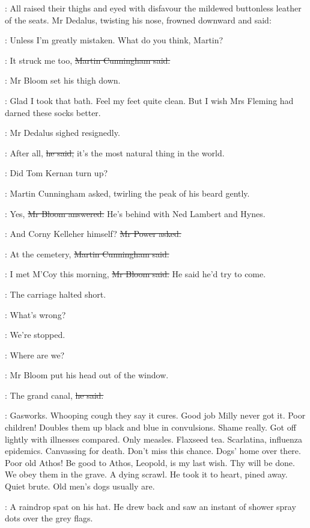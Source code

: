:
All raised their thighs and eyed with disfavour
the mildewed buttonless leather of the seats.
Mr Dedalus, twisting his nose, frowned downward and said:

\simon:
Unless I'm greatly mistaken.
What do you think, Martin?

\cunningham:
It struck me too,
\sout{Martin Cunningham said.}

:
Mr Bloom set his thigh down.

\BloomInt:
Glad I took that bath.
Feel my feet quite clean.
But I wish Mrs Fleming had darned these socks better.

:
Mr Dedalus sighed resignedly.

\simon:
After all,
\sout{he said,}
it's the most natural thing in the world.

\cunningham:
Did Tom Kernan turn up?

:
Martin Cunningham asked,
twirling the peak of his beard
gently.

\Bloom:
Yes,
\sout{Mr Bloom answered.}
He's behind with Ned Lambert and Hynes.

\power:
And Corny Kelleher himself?
\sout{Mr Power asked.}

\cunningham:
At the cemetery,
\sout{Martin Cunningham said.}

\Bloom:
I met M'Coy this morning,
\sout{Mr Bloom said.}
He said he'd try to come.

:
The carriage halted short.

\simon:
What's wrong?

\power:
We're stopped.

\cunningham:
Where are we?

:
Mr Bloom put his head out of the window.

\Bloom:
The grand canal,
\sout{he said.}

\BloomInt:
Gasworks.
Whooping cough they say it cures.
Good job Milly never got it.
Poor children!
Doubles them up black and blue in convulsions.
Shame really.
Got off lightly with illnesses compared.
Only measles.
Flaxseed tea.
Scarlatina, influenza epidemics.
Canvassing for death.
Don't miss this chance.
Dogs' home over there.
Poor old Athos!
Be good to Athos, Leopold, is my last wish.
Thy will be done.
We obey them in the grave.
A dying scrawl.
He took it to heart, pined away.
Quiet brute.
Old men's dogs usually are.

:
A raindrop spat on his hat.
He drew back and saw an instant of shower spray dots over the grey flags.

